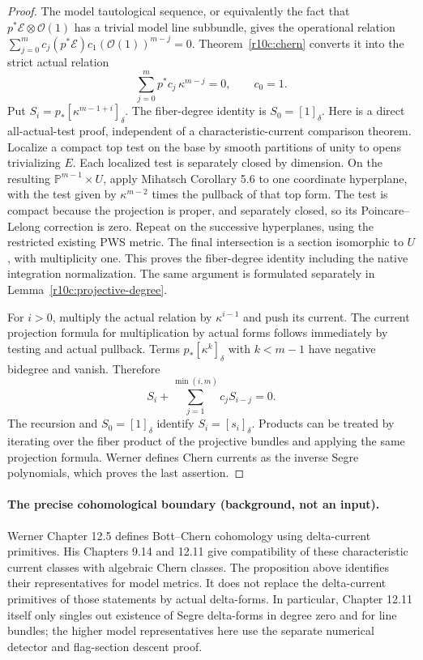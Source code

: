 \begin{proof}
The model tautological sequence, or equivalently the fact that
$p^*\mathcal E\otimes\mathcal O(1)$ has a trivial model line subbundle,
gives the operational relation
$\sum_{j=0}^{m}c_j(p^*\mathcal E)c_1(\mathcal O(1))^{m-j}=0$.
Theorem~\ref{r10c:chern} converts it into the strict actual relation
\[
                  \sum_{j=0}^{m}p^*c_j\,\kappa^{m-j}=0,
                         \qquad c_0=1.
\]
Put $S_i=p_*[\kappa^{m-1+i}]_\delta$.  The fiber-degree identity
is $S_0=[1]_\delta$.  Here is a direct all-actual-test proof, independent
of a characteristic-current comparison theorem.  Localize a compact
top test on the base by smooth partitions of unity to opens trivializing
$E$.  Each localized test is separately closed by dimension.  On the
resulting $\mathbb P^{m-1}\times U$, apply Mihatsch Corollary 5.6 to
one coordinate hyperplane, with the test given by $\kappa^{m-2}$
times the pullback of that top form.  The test is compact because the
projection is proper, and separately closed, so its Poincare--Lelong
correction is zero.  Repeat on the successive hyperplanes, using the
restricted existing PWS metric.  The final intersection is a section
isomorphic to $U$, with multiplicity one.  This proves the fiber-degree
identity including the native integration normalization.  The same
argument is formulated separately in Lemma~\ref{r10c:projective-degree}.

For $i>0$, multiply the actual relation by $\kappa^{i-1}$ and
push its current.  The current projection formula for multiplication
by actual forms follows immediately by testing and actual pullback.
Terms $p_*[\kappa^k]_\delta$ with $k<m-1$ have negative bidegree
and vanish.  Therefore
\[
                         S_i+\sum_{j=1}^{\min(i,m)}c_jS_{i-j}=0.
\]
The recursion and $S_0=[1]_\delta$ identify $S_i=[s_i]_\delta$.
Products can be treated by iterating over the fiber product of the
projective bundles and applying the same projection formula.  Werner
defines Chern currents as the inverse Segre polynomials, which proves
the last assertion.
\end{proof}

\paragraph{The precise cohomological boundary (background, not an input).}
Werner Chapter 12.5 defines Bott--Chern cohomology using delta-current
primitives.  His Chapters 9.14 and 12.11 give compatibility of these
characteristic current classes with algebraic Chern classes.  The
proposition above identifies their representatives for model metrics.
It does not replace the delta-current primitives of those statements by
actual delta-forms.  In particular, Chapter 12.11 itself only singles
out existence of Segre delta-forms in degree zero and for line bundles;
the higher model representatives here use the separate numerical
detector and flag-section descent proof.

